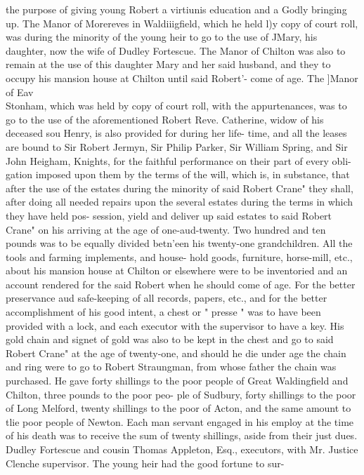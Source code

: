 \documentclass{book}
\begin{document}
the purpose of giving young Robert a virtiunis education and a 
Godly bringing up. The Manor of Morereves in Waldiiigfield, 
which he held l)y copy of court roll, was during the minority of 
the young heir to go to the use of JMary, his daughter, now the 
wife of Dudley Fortescue. The Manor of Chilton was also to 
remain at the use of this daughter Mary and her said husband, 
and they to occupy his mansion house at Chilton until said 
Robert'- come of age. The ]Manor of Eav\\ Stonham, which 
was held by copy of court roll, with the appurtenances, was to go 
to the use of the aforementioned Robert Reve. Catherine, widow 
of his deceased sou Henry, is also provided for during her life- 
time, and all the leases are bound to Sir Robert Jermyn, Sir 
Philip Parker, Sir William Spring, and Sir John Heigham, 
Knights, for the faithful performance on their part of every obli- 
gation imposed upon them by the terms of the will, which is, in 
substance, that after the use of the estates during the minority of 
said Robert Crane" they shall, after doing all needed repairs upon 
the several estates during the terms in which they have held pos- 
session, yield and deliver up said estates to said Robert Crane" 
on his arriving at the age of one-aud-twenty. Two hundred and 
ten pounds was to be equally divided betn'een his twenty-one 
grandchildren. All the tools and farming implements, and house- 
hold goods, furniture, horse-mill, etc., about his mansion house 
at Chilton or elsewhere were to be inventoried and an account 
rendered for the said Robert when he should come of age. For 
the better preservance aud safe-keeping of all records, papers, etc., 
and for the better accomplishment of his good intent, a chest or 
" presse " was to have been provided with a lock, and each executor 
with the supervisor to have a key. His gold chain and signet of 
gold was also to be kept in the chest and go to said Robert Crane" 
at the age of twenty-one, and should he die under age the chain 
and ring were to go to Robert Straungman, from whose father the 
chain was purchased. He gave forty shillings to the poor people 
of Great Waldingfield and Chilton, three pounds to the poor peo- 
ple of Sudbury, forty shillings to the poor of Long Melford, 
twenty shillings to the poor of Acton, and the same amount to 
tlie poor people of Newton. Each man servant engaged in his 
employ at the time of his death was to receive the sum of twenty 
shillings, aside from their just dues. Dudley Fortescue and 
cousin Thomas Appleton, Esq., executors, with Mr. Justice 
Clenche supervisor. The young heir had the good fortune to sur- 
\end{document}
